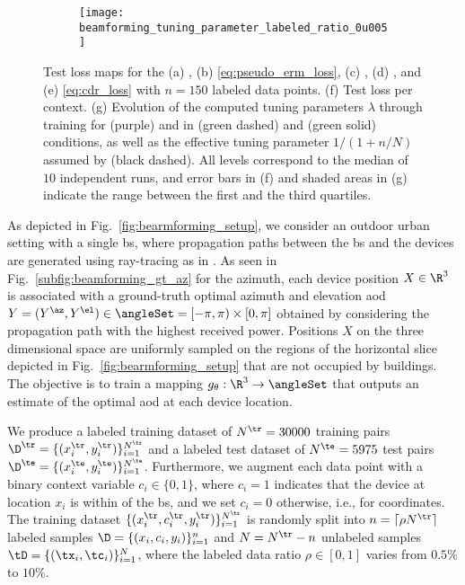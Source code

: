 \documentclass[journal]{IEEEtran}
\begin{document}
\begin{figure*}
    \begin{subfigure}{0.24\textwidth}
        \centering
        \vspace{0.07in}
        \texttt{[image: beamforming\_tuning\_parameter\_labeled\_ratio\_0u005]}
        \vspace{-0.07in}
        \caption{}
        \label{subfig:tuning_parameter}
    \end{subfigure}
    \caption{
    Test loss maps for the (a) , (b)  \eqref{eq:pseudo_erm_loss}, (c)  \cite{zhu2024doubly}, (d) , and (e)  \eqref{eq:cdr_loss} with $n=150$ labeled data points.
    (f) Test loss per context.
    (g) Evolution of the computed tuning parameters $\lambda$ through training for  (purple) and  in  (green dashed) and  (green solid) conditions, as well as the effective tuning parameter $1 / (1 + n/N)$ assumed by  (black dashed).
    All levels correspond to the median of $10$ independent runs, and error bars in (f) and shaded areas in (g) indicate the range between the first and the third quartiles.
    }
    \label{fig:bearmforming_errors_distribution}
\end{figure*}


As depicted in Fig.~\ref{fig:bearmforming_setup}, we consider an outdoor urban setting with a single \gls{bs}, where propagation paths between the \gls{bs} and the devices are generated using ray-tracing as in \cite{zeng2021toward}.
As seen in Fig.~\ref{subfig:beamforming_gt_az} for the azimuth, each device position $X \in \R^3$ is associated with a ground-truth optimal azimuth and elevation \gls{aod} $Y = (Y^\az, Y^\el) \in \angleSet = [- \pi, \pi) \times [0, \pi]$ obtained by considering the propagation path with the highest received power.
Positions $X$ on the three dimensional space are uniformly sampled on the regions of the horizontal slice depicted in Fig.~\ref{fig:bearmforming_setup} that are not occupied by buildings.
The objective is to train a mapping $g_\theta: \R^3 \to \angleSet$ that outputs an estimate of the optimal \gls{aod} at each device location.

We produce a labeled training dataset of $N^\tr = 30000$ training pairs $\D^\tr = \{(x^\tr_i, y^\tr_i)\}_{i=1}^{N^\tr}$ and a labeled test dataset of $N^\te = 5975$ test pairs $\D^\te = \{(x^\te_i, y^\te_i)\}_{i=1}^{N^\te}$.
Furthermore, we augment each data point with a binary context variable $c_i \in \{0, 1\}$, where $c_i = 1$ indicates that the device at location $x_i$ is within  of the \gls{bs}, and we set $c_i = 0$ otherwise, i.e., for  coordinates.
The training dataset $\{(x^\tr_i, c^\tr_i, y^\tr_i)\}_{i=1}^{N^\tr}$ is randomly split into $n = \lceil \rho N^\tr \rceil$ labeled samples $\D = \{(x_i, c_i, y_i)\}_{i=1}^{n}$ and $N = N^\tr - n$ unlabeled samples $\tD = \{(\tx_i, \tc_i)\}_{i=1}^{N}$, where the labeled data ratio $\rho \in [0, 1]$ varies from $0.5\%$ to $10\%$.
\end{document}
